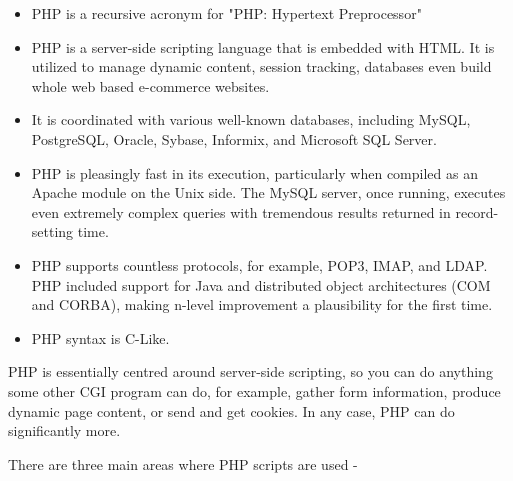\documentclass[../thesis.tex]{subfiles}
\begin{document}
\begin{itemize}
  \item PHP is a recursive acronym for "PHP: Hypertext Preprocessor"
  \item PHP is a server-side scripting language that is embedded with HTML. It is utilized to manage dynamic content, session tracking, databases even build whole web based e-commerce websites. 
  \item It is coordinated with various well-known databases, including MySQL, PostgreSQL, Oracle, Sybase, Informix, and Microsoft SQL Server. 
  \item PHP is pleasingly fast in its execution, particularly when compiled as an Apache module on the Unix side. The MySQL server, once running, executes even extremely complex queries with tremendous results returned in record-setting time. 
  \item PHP supports countless protocols, for example, POP3, IMAP, and LDAP. PHP included support for Java and distributed object architectures (COM and CORBA), making n-level improvement a plausibility for the first time. 
  \item PHP syntax is C-Like.  
\end{itemize}
    
PHP is essentially centred around server-side scripting, so you can do anything some other CGI program can do, for example, gather form information, produce dynamic page content, or send and get cookies. In any case, PHP can do significantly more.
\newline
    
There are three main areas where PHP scripts are used -
\newline
    
\end{document}
